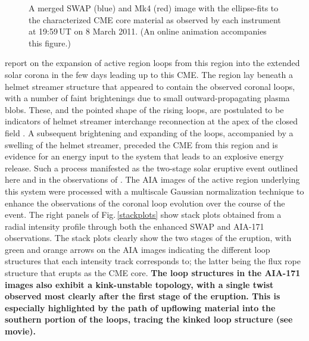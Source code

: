 \documentclass[namedreferences]{solarphysics}
\begin{document}
\begin{article}
\begin{figure}[t]
\caption{A merged SWAP (blue) and Mk4 (red) image with the ellipse-fits to the characterized CME core material as observed by each instrument at 19:59\,UT on 8 March 2011. (An online animation accompanies this figure.)}
\label{combined}
\end{figure}

 report on the expansion of active region loops from this region into the extended solar corona in the few days leading up to this CME. The region lay beneath a helmet streamer structure that appeared to contain the observed coronal loops, with a number of faint brightenings due to small outward-propagating plasma blobs. These, and the pointed shape of the rising loops, are postulated to be indicators of helmet streamer interchange reconnection at the apex of the closed field \cite{2012ApJ...749..182W}. A subsequent brightening and expanding of the loops, accompanied by a swelling of the helmet streamer, preceded the CME from this region and is evidence for an energy input to the system that leads to an explosive energy release. Such a process manifested as the two-stage solar eruptive event outlined here and in the observations of . The AIA images of the active region underlying this system were processed with a multiscale Gaussian normalization technique \cite{MorganDruckmuller_inreview} to enhance the observations of the coronal loop evolution over the course of the event. The right panels of Fig.\,\ref{stackplots} show stack plots obtained from a radial intensity profile through both the enhanced SWAP and AIA-171 observations. The stack plots clearly show the two stages of the eruption, with green and orange arrows on the AIA images indicating the different loop structures that each intensity track corresponds to; the latter being the flux rope structure that erupts as the CME core. {\bf The loop structures in the AIA-171 images also exhibit a kink-unstable topology, with a single twist observed most clearly after the first stage of the eruption. This is especially highlighted by the path of upflowing material into the southern portion of the loops, tracing the kinked loop structure (see movie).}	 


\end{article}
\end{document}
